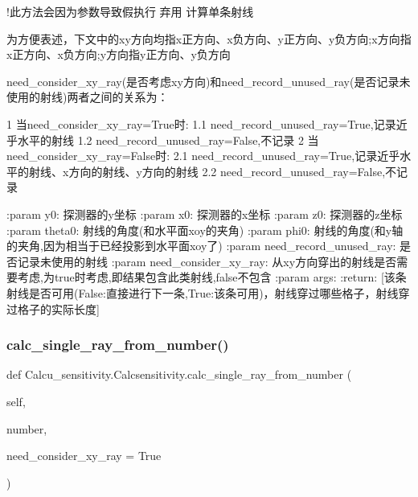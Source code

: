 \begin{DoxyVerb}!此方法会因为参数导致假执行 弃用
计算单条射线

为方便表述，下文中的xy方向均指x正方向、x负方向、y正方向、y负方向;x方向指x正方向、x负方向;y方向指y正方向、y负方向

need_consider_xy_ray(是否考虑xy方向)和need_record_unused_ray(是否记录未使用的射线)两者之间的关系为：

1 当need_consider_xy_ray=True时:
1.1 need_record_unused_ray=True,记录近乎水平的射线
1.2 need_record_unused_ray=False,不记录
2 当need_consider_xy_ray=False时:
2.1 need_record_unused_ray=True,记录近乎水平的射线、x方向的射线、y方向的射线
2.2 need_record_unused_ray=False,不记录

:param y0: 探测器的y坐标
:param x0: 探测器的x坐标
:param z0: 探测器的z坐标
:param theta0: 射线的角度(和水平面xoy的夹角)
:param phi0: 射线的角度(和y轴的夹角,因为相当于已经投影到水平面xoy了)
:param need_record_unused_ray: 是否记录未使用的射线
:param need_consider_xy_ray: 从xy方向穿出的射线是否需要考虑,为true时考虑,即结果包含此类射线,false不包含
:param args:
:return: [该条射线是否可用(False:直接进行下一条,True:该条可用)，射线穿过哪些格子，射线穿过格子的实际长度]
\end{DoxyVerb}
 \mbox{\label{classCalcu__sensitivity_1_1Calcsensitivity_a2bb4f42d1e79c2b6d62f16a84685ba61}} 
\subsubsection{\texorpdfstring{calc\+\_\+single\+\_\+ray\+\_\+from\+\_\+number()}{calc\_single\_ray\_from\_number()}}
{\footnotesize\ttfamily def Calcu\+\_\+sensitivity.\+Calcsensitivity.\+calc\+\_\+single\+\_\+ray\+\_\+from\+\_\+number (\begin{DoxyParamCaption}\item[{}]{self,  }\item[{}]{number,  }\item[{}]{need\+\_\+consider\+\_\+xy\+\_\+ray = {\ttfamily True} }\end{DoxyParamCaption})}

